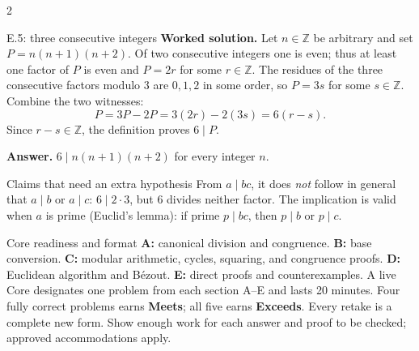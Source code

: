 \documentclass[10pt]{article}
\newcommand{\Z}{\mathbb Z}
\begin{document}
\begin{multicols}{2}
\begin{workedbox}{E.5: three consecutive integers}
\textbf{Worked solution.} Let $n\in\Z$ be arbitrary and set $P=n(n+1)(n+2)$. Of two consecutive integers one is even; thus at least one factor of $P$ is even and $P=2r$ for some $r\in\Z$. The residues of the three consecutive factors modulo $3$ are $0,1,2$ in some order, so $P=3s$ for some $s\in\Z$. Combine the two witnesses:\[P=3P-2P=3(2r)-2(3s)=6(r-s).\]Since $r-s\in\Z$, the definition proves $6\mid P$.

\textbf{Answer.} $6\mid n(n+1)(n+2)$ for every integer $n$.
\end{workedbox}

\begin{warningbox}{Claims that need an extra hypothesis}
From $a\mid bc$, it does \emph{not} follow in general that $a\mid b$ or
$a\mid c$: $6\mid2\cdot3$, but $6$ divides neither factor. The implication
is valid when $a$ is prime (Euclid's lemma): if prime $p\mid bc$, then
$p\mid b$ or $p\mid c$.
\end{warningbox}

\begin{checklistbox}{Core readiness and format}
\textbf{A:} canonical division and congruence. \textbf{B:} base conversion.
\textbf{C:} modular arithmetic, cycles, squaring, and congruence proofs.
\textbf{D:} Euclidean algorithm and B\'ezout. \textbf{E:} direct proofs and
counterexamples. A live Core designates one problem from each section A--E
and lasts 20 minutes. Four fully correct problems earns \textbf{Meets}; all
five earns \textbf{Exceeds}. Every retake is a complete new form. Show enough
work for each answer and proof to be checked; approved accommodations apply.
\end{checklistbox}
\end{multicols}
\endgroup

\thispagestyle{fancy}
\end{document}
